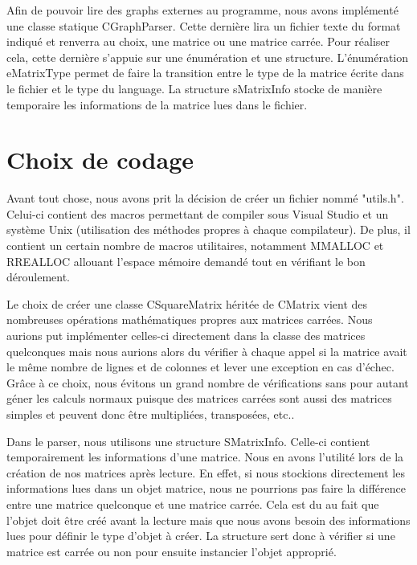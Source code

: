 		Afin de pouvoir lire des graphs externes au programme, nous avons implémenté une classe statique CGraphParser. Cette dernière lira un fichier texte du format indiqué et renverra au choix, une matrice ou une matrice carrée. Pour réaliser cela, cette dernière s'appuie sur une énumération et une structure. L'énumération eMatrixType permet de faire la transition entre le type de la matrice écrite dans le fichier et le type du language. La structure sMatrixInfo stocke de manière temporaire les informations de la matrice lues dans le fichier. 
		
		
	\chapter{Choix de codage}
		Avant tout chose, nous avons prit la décision de créer un fichier nommé "utils.h". Celui-ci contient des macros permettant de compiler sous Visual Studio et un système Unix (utilisation des méthodes propres à chaque compilateur). De plus, il contient un certain nombre de macros utilitaires, notamment MMALLOC et RREALLOC allouant l'espace mémoire demandé tout en vérifiant le bon déroulement.
	
		Le choix de créer une classe CSquareMatrix héritée de CMatrix vient des nombreuses opérations mathématiques propres aux matrices carrées. Nous aurions put implémenter celles-ci directement dans la classe des matrices quelconques mais nous aurions alors du vérifier à chaque appel si la matrice avait le même nombre de lignes et de colonnes et lever une exception en cas d'échec.
		Grâce à ce choix, nous évitons un grand nombre de vérifications sans pour autant géner les calculs normaux puisque des matrices carrées sont aussi des matrices simples et peuvent donc être multipliées, transposées, etc..
		
		
	
		Dans le parser, nous utilisons une structure SMatrixInfo. Celle-ci contient temporairement les informations d'une matrice. Nous en avons l'utilité lors de la création de nos matrices après lecture. En effet, si nous stockions directement les informations lues dans un objet matrice, nous ne pourrions pas faire la différence entre une matrice quelconque et une matrice carrée. Cela est du au fait que l'objet doit être créé avant la lecture mais que nous avons besoin des informations lues pour définir le type d'objet à créer. La structure sert donc à vérifier si une matrice est carrée ou non pour ensuite instancier l'objet approprié.
	
